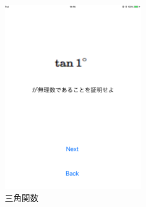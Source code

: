 \documentclass[ams]{U-AizuGT}
\begin{document}
     \begin{figure}[htb]
       \centering
       \includegraphics[width=6cm]{img/figure5.pdf}
       \caption{三角関数}
       \label{fig:ict}
     \end{figure}

	
\end{document}
